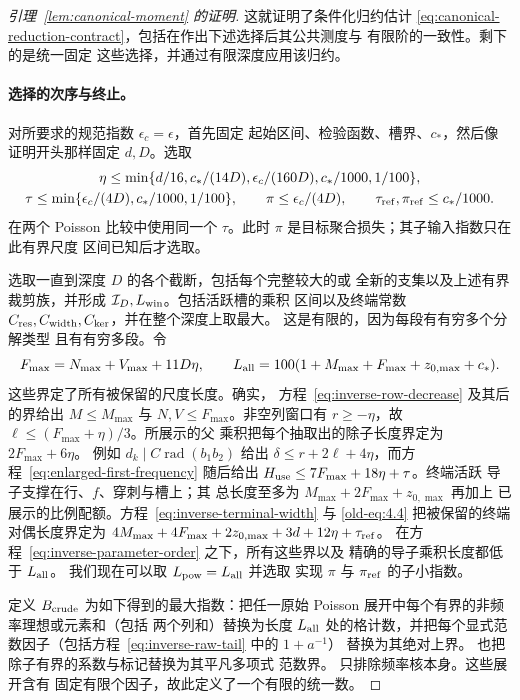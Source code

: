 \documentclass[11pt,a4paper]{article}
\numberwithin{equation}{section}
\numberwithin{figure}{section}
\theoremstyle{definition}
\theoremstyle{remark}
\begin{document}
\begin{proof}[引理~\ref{lem:canonical-moment} 的证明]
这就证明了条件化归约估计
\eqref{eq:canonical-reduction-contract}，包括在作出下述选择后其公共测度与
有限阶的一致性。剩下的是统一固定
这些选择，并通过有限深度应用该归约。

\paragraph{选择的次序与终止。}
对所要求的规范指数 \(\epsilon_c=\epsilon\)，首先固定
起始区间、检验函数、槽界、\(c_*\)，然后像证明开头那样固定 \(d,D\)。选取
\begin{equation}\label{eq:inverse-parameter-order}
 \begin{gathered}
 \eta\le\min\{d/16,c_*/(14D),\epsilon_c/(160D),c_*/1000,1/100\},\\
 \tau\le\min\{\epsilon_c/(4D),c_*/1000,1/100\},\qquad
 \pi\le\epsilon_c/(4D),\qquad
 \tau_{\rm ref},\pi_{\rm ref}\le c_*/1000.
 \end{gathered}
\end{equation}
在两个 Poisson 比较中使用同一个 \(\tau\)。此时 \(\pi\)
是目标聚合损失；其子输入指数只在此有界尺度
区间已知后才选取。

选取一直到深度 \(D\) 的各个截断，包括每个完整较大的或
全新的支集以及上述有界裁剪族，并形成
\(\mathcal I_D,L_{\rm win}\)。包括活跃槽的乘积
区间以及终端常数
\(C_{\rm res},C_{\rm width},C_{\rm ker}\)，并在整个深度上取最大。
这是有限的，因为每段有有穷多个分解类型
且有有穷多段。令
\[
 F_{\max}=N_{\max}+V_{\max}+11D\eta,\qquad
 L_{\rm all}=100(1+M_{\max}+F_{\max}+z_{0,\max}+c_*).
\]
这些界定了所有被保留的尺度长度。确实，
方程~\eqref{eq:inverse-row-decrease} 及其后的界给出
\(M\le M_{\max}\) 与 \(N,V\le F_{\max}\)。非空列窗口有
\(r\ge-\eta\)，故 \(\ell\le(F_{\max}+\eta)/3\)。所展示的父
乘积把每个抽取出的除子长度界定为 \(2F_{\max}+6\eta\)。
例如 \(d_k\mid C\operatorname{rad}(b_1b_2)\) 给出
\(\delta\le r+2\ell+4\eta\)，而方程~\eqref{eq:enlarged-first-frequency}
随后给出 \(H_{\rm use}\le7F_{\max}+18\eta+\tau\)。终端活跃
导子支撑在行、\(f\)、穿刺与槽上；其
总长度至多为 \(M_{\max}+2F_{\max}+z_{0,\max}\) 再加上
已展示的比例配额。方程~\eqref{eq:inverse-terminal-width}
与 \eqref{old-eq:4.4} 把被保留的终端对偶长度界定为
\(4M_{\max}+4F_{\max}+2z_{0,\max}+3d+12\eta+\tau_{\rm ref}\)。
在方程~\eqref{eq:inverse-parameter-order} 之下，所有这些界以及
精确的导子乘积长度都低于 \(L_{\rm all}\)。
我们现在可以取 \(L_{\rm pow}=L_{\rm all}\) 并选取
实现 \(\pi\) 与 \(\pi_{\rm ref}\) 的子小指数。

定义 \(B_{\rm crude}\) 为如下得到的最大指数：把任一原始 Poisson
展开中每个有界的非频率理想或元素和（包括
两个列和）替换为长度
\(L_{\rm all}\) 处的格计数，并把每个显式范数因子（包括方程~\eqref{eq:inverse-raw-tail} 中的 \(1+a^{-1}\)）
替换为其绝对上界。
也把除子有界的系数与标记替换为其平凡多项式
范数界。
只排除频率核本身。这些展开含有
固定有限个因子，故此定义了一个有限的统一数。


\end{proof}
\end{document}

